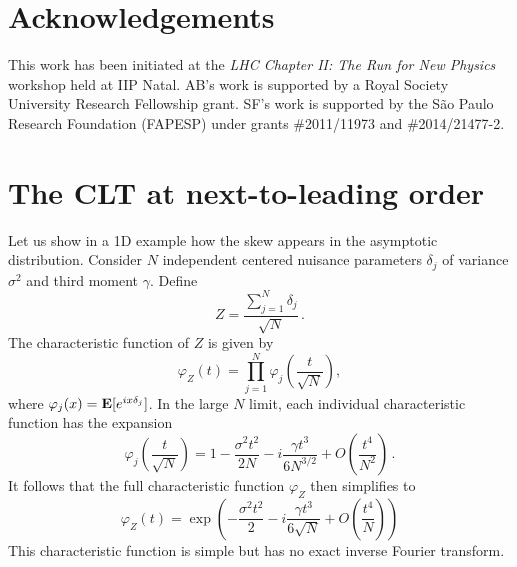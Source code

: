 \documentclass[11pt]{article}
\newcommand{\be}{\begin{equation}}
\newcommand{\ee}{\end{equation}}
\begin{document}
\section*{Acknowledgements}

 This work has been initiated at the \textit{LHC Chapter II: The Run for New Physics} workshop held at IIP Natal.
 AB's work is supported by a Royal Society University Research Fellowship grant.
 SF's work is supported by the S\~ao Paulo Research Foundation (FAPESP) under grants \#2011/11973 and \#2014/21477-2.


\appendix

\section{The CLT at next-to-leading order}
\label{app:skew}




Let us show in a 1D example how the skew appears  in the asymptotic distribution. Consider $N$ independent centered nuisance parameters $\delta_j$ of variance $\sigma^2$ and third moment $\gamma$. Define \be Z=\frac{\sum_{j=1}^N \delta_j}{\sqrt{N}}\,.
\ee
The characteristic function of $Z$ is given by
\be
\varphi_Z(t)=\prod_{j=1}^N\varphi_{j}\left(\frac{t}{\sqrt{N}}\right),
\ee
where $\varphi_{j}(x) = {\bf E}[e^{ix\delta_{j}}]$.
 In the large $N$ limit, each individual characteristic function has the expansion
\be
\varphi_{j}\left(\frac{t}{\sqrt{N}}\right)= 1-\frac{\sigma^2 t^2}{2N}-i \frac{\gamma t^3}{6 N^{3/2}} +O\left(\frac{t^4}{N^2}\right)\,.
\ee
It follows that the full characteristic function $\varphi_Z$ then simplifies to
\be
\varphi_Z(t)=\exp\left(-\frac{\sigma^2 t^2}{2}-i \frac{\gamma t^3}{6 \sqrt{N}} +O\left(\frac{t^4}{N}\right)\right) \label{eq:CF_CLT}
 \ee
 This characteristic function is simple but has no exact inverse Fourier transform.
\end{document}

